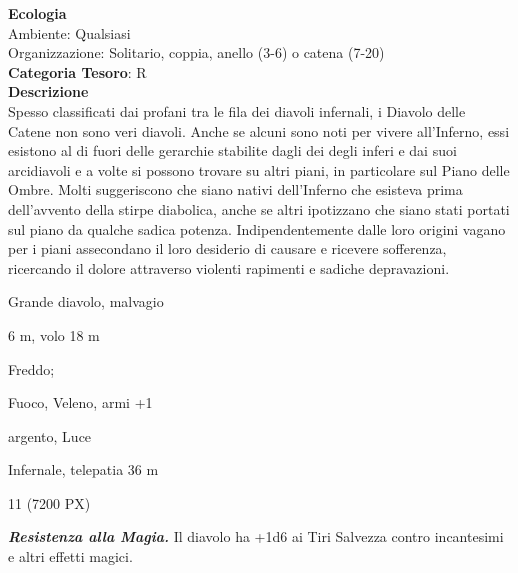 \begin{multicols}{2}
{\textbf{Ecologia}\\
Ambiente: Qualsiasi\\
Organizzazione: Solitario, coppia, anello (3-6) o catena (7-20)\\
\textbf{Categoria Tesoro}: R\\
\textbf{Descrizione}\\
Spesso classificati dai profani tra le fila dei diavoli infernali, i Diavolo delle Catene non sono veri diavoli. Anche se alcuni sono noti per vivere all'Inferno, essi esistono al di fuori delle gerarchie stabilite dagli dei degli inferi e dai suoi arcidiavoli e a volte si possono trovare su altri piani, in particolare sul Piano delle Ombre. Molti suggeriscono che siano nativi dell'Inferno che esisteva prima dell'avvento della stirpe diabolica, anche se altri ipotizzano che siano stati portati sul piano da qualche sadica potenza. Indipendentemente dalle loro origini vagano per i piani assecondano il loro desiderio di causare e ricevere sofferenza, ricercando il dolore attraverso violenti rapimenti e sadiche depravazioni.

\begin{description}[noitemsep, topsep=0pt, parsep=0pt, partopsep=0pt, itemsep=1pt, leftmargin=2.35cm,  labelwidth=2.2cm, itemindent=0cm, listparindent=0pt] %
\setlength{\baselineskip}{10pt}
\item[\textbf{Taglia/Tipo}] Grande diavolo, malvagio
\item[\textbf{Caratt.}] 
\item[\textbf{Punti Ferita}] 
\item[\textbf{Movimento}] 6 m, volo 18 m
\item[\textbf{Tiri Salvez.}] 
\item[\textbf{Res. Danni}] Freddo;
\item[\textbf{Imm. Danni}] Fuoco, Veleno, armi +1
\item[\textbf{Vulnerabilità}] argento, Luce
\item[\textbf{Sensi}] 
\item[\textbf{Linguaggi}] Infernale, telepatia 36 m
\item[\textbf{Sfida}] 11 (7200 PX)
\end{description}
\smallskip

\emph{\textbf{Resistenza alla Magia.}} Il diavolo ha +1d6 ai Tiri Salvezza contro incantesimi e altri effetti magici.

}
\end{multicols}
